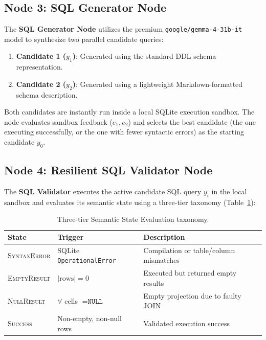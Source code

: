 \subsection{Node 3: SQL Generator Node}
The \textbf{SQL Generator Node} utilizes the premium \texttt{google/gemma-4-31b-it} model to synthesize two parallel candidate queries:
\begin{enumerate}
    \item \textbf{Candidate 1 ($y_1$)}: Generated using the standard DDL schema representation.
    \item \textbf{Candidate 2 ($y_2$)}: Generated using a lightweight Markdown-formatted schema description.
\end{enumerate}
Both candidates are instantly run inside a local SQLite execution sandbox. The node evaluates sandbox feedback ($e_1, e_2$) and selects the best candidate (the one executing successfully, or the one with fewer syntactic errors) as the starting candidate $y_0$.

\subsection{Node 4: Resilient SQL Validator Node}
The \textbf{SQL Validator} executes the active candidate SQL query $y_i$ in the local sandbox and evaluates its semantic state using a three-tier taxonomy (Table~\ref{tab:semantic_states}):

\begin{table}[t]
    \centering
    \caption{Three-tier Semantic State Evaluation taxonomy.}
    \label{tab:semantic_states}
    \footnotesize
    \setlength{\tabcolsep}{3pt}
    \begin{tabularx}{\columnwidth}{@{}l>{\raggedright\arraybackslash}X>{\raggedright\arraybackslash}X@{}}
        \toprule
        \textbf{State}       & \textbf{Trigger}                  & \textbf{Description}                 \\
        \midrule
        \textsc{SyntaxError} & SQLite \texttt{OperationalError}  & Compilation or table/column mismatches\\
        \textsc{EmptyResult} & $|\mathrm{rows}| = 0$             & Executed but returned empty results  \\
        \textsc{NullResult}  & $\forall$ cells $= \texttt{NULL}$ & Empty projection due to faulty JOIN  \\
        \textsc{Success}     & Non-empty, non-null rows          & Validated execution success           \\
        \bottomrule
    \end{tabularx}
\end{table}

